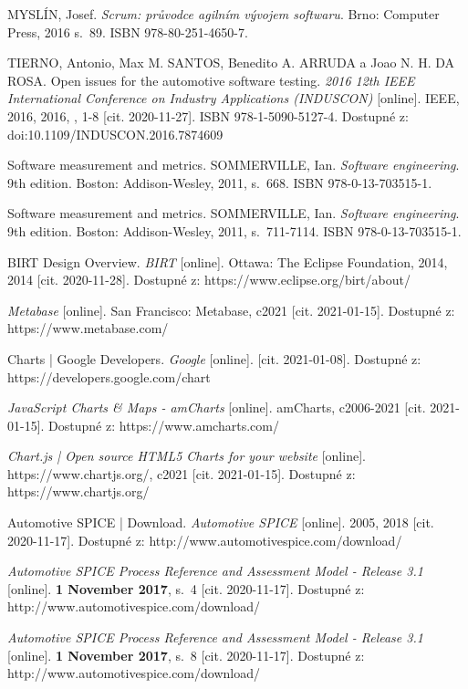 \documentclass[czech,master,public,dept460,male,cpdeclaration,oneside]{diploma}
\begin{document}
\begin{thebibliography}{41}
MYSLÍN, Josef. \textit{Scrum: průvodce agilním vývojem softwaru}. Brno: Computer Press, 2016 s.~89. ISBN 978-80-251-4650-7.

TIERNO, Antonio, Max M. SANTOS, Benedito A. ARRUDA a Joao N. H. DA ROSA. Open issues for the automotive software testing. \textit{2016 12th IEEE International Conference on Industry Applications (INDUSCON)} [online]. IEEE, 2016, 2016, , 1-8 [cit. 2020-11-27]. ISBN 978-1-5090-5127-4. Dostupné z: doi:10.1109/INDUSCON.2016.7874609

Software measurement and metrics. SOMMERVILLE, Ian. \textit{Software engineering}. 9th edition. Boston: Addison-Wesley, 2011, s.~668. ISBN 978-0-13-703515-1.


Software measurement and metrics. SOMMERVILLE, Ian. \textit{Software engineering}. 9th edition. Boston: Addison-Wesley, 2011, s.~711-7114. ISBN 978-0-13-703515-1.

BIRT Design Overview. \textit{BIRT} [online]. Ottawa: The Eclipse Foundation, 2014, 2014 [cit. 2020-11-28]. Dostupné z: https://www.eclipse.org/birt/about/

\textit{Metabase} [online]. San Francisco: Metabase, c2021 [cit. 2021-01-15]. Dostupné z: https://www.metabase.com/

Charts | Google Developers. \textit{Google} [online]. [cit. 2021-01-08]. Dostupné z: https://developers.google.com/chart

\textit{JavaScript Charts \& Maps - amCharts} [online]. amCharts, c2006-2021 [cit. 2021-01-15]. Dostupné z: https://www.amcharts.com/

\textit{Chart.js | Open source HTML5 Charts for your website} [online]. https://www.chartjs.org/, c2021 [cit. 2021-01-15]. Dostupné z: https://www.chartjs.org/

Automotive SPICE | Download. \textit{Automotive SPICE} [online]. 2005, 2018 [cit. 2020-11-17]. Dostupné z: http://www.automotivespice.com/download/

\textit{Automotive SPICE Process Reference and Assessment Model - Release 3.1} [online]. \textbf{1 November 2017}, s.~4 [cit. 2020-11-17]. Dostupné z: http://www.automotivespice.com/download/

\textit{Automotive SPICE Process Reference and Assessment Model - Release 3.1} [online]. \textbf{1 November 2017}, s.~8 [cit. 2020-11-17]. Dostupné z: http://www.automotivespice.com/download/


\end{thebibliography}
\end{document}

